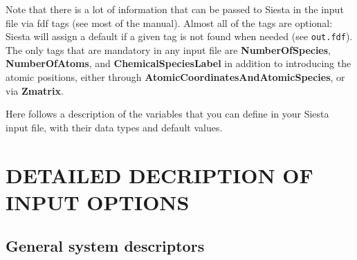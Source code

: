 \documentclass[11pt]{article}
\begin{document}
Note that there is a lot of information that can be 
passed to {\sc Siesta} in the input file via fdf tags
(see most of the manual). Almost all of the tags are
optional: {\sc Siesta} will assign a default if a given tag
is not found when needed (see {\tt out.fdf}).
The only tags that are mandatory in any input file are
{\bf NumberOfSpecies}, 
{\bf NumberOfAtoms}, 
and {\bf ChemicalSpeciesLabel} 
in addition to introducing the atomic positions, either through
{\bf AtomicCoordinatesAndAtomicSpecies}, 
or via {\bf Zmatrix}. 

Here follows a description of the variables that you can
define in your {\sc Siesta} input file, with their data types and
default values.


\section{DETAILED DECRIPTION OF INPUT OPTIONS}
\vspace{5pt}
\subsection{General system descriptors}
\end{document}
